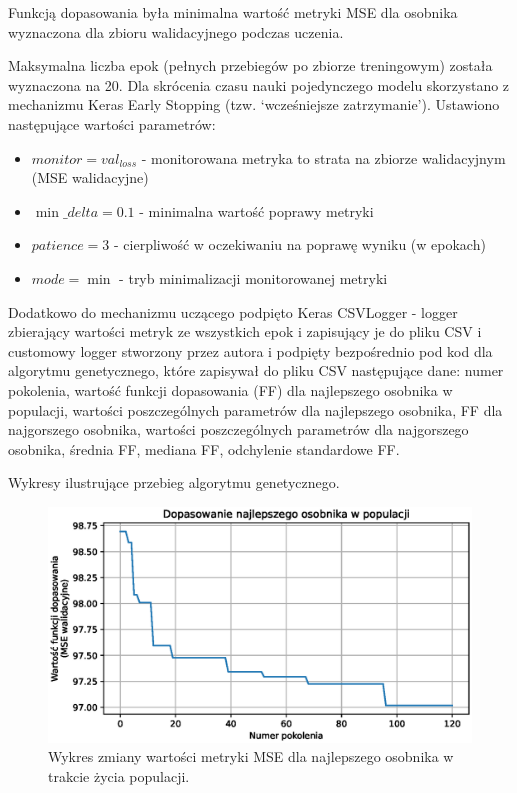 \documentclass[a4paper,12pt]{article}
\numberwithin{figure}{section}
\begin{document}
    \bigskip

    Funkcją dopasowania była minimalna wartość metryki MSE dla osobnika wyznaczona dla zbioru walidacyjnego podczas uczenia.

    \bigskip

    Maksymalna liczba epok (pełnych przebiegów po zbiorze treningowym) została wyznaczona na 20. Dla skrócenia czasu nauki pojedynczego modelu skorzystano z mechanizmu Keras Early Stopping (tzw. `wcześniejsze zatrzymanie'). Ustawiono następujące wartości parametrów:
    \begin{itemize}
        \item $monitor = val_{loss}$ - monitorowana metryka to strata na zbiorze walidacyjnym (MSE walidacyjne)
        \item $\min\_delta = 0.1$ - minimalna wartość poprawy metryki
        \item $patience = 3$ - cierpliwość w oczekiwaniu na poprawę wyniku (w epokach)
        \item $mode = \min$ - tryb minimalizacji monitorowanej metryki
    \end{itemize}

    \bigskip

    Dodatkowo do mechanizmu uczącego podpięto Keras CSVLogger - logger zbierający wartości metryk ze wszystkich epok i zapisujący je do pliku CSV i customowy logger stworzony przez autora i podpięty bezpośrednio pod kod dla algorytmu genetycznego, które zapisywał do pliku CSV następujące dane: numer pokolenia, wartość funkcji dopasowania (FF) dla najlepszego osobnika w populacji, wartości poszczególnych parametrów dla najlepszego osobnika, FF dla najgorszego osobnika, wartości poszczególnych parametrów dla najgorszego osobnika, średnia FF, mediana FF, odchylenie standardowe FF\@.

    \bigskip

    Wykresy ilustrujące przebieg algorytmu genetycznego.

    \bigskip

    \begin{figure}[H]
        \centering
        \includegraphics[width=\textwidth]{g_a_best_fitness}
        \caption{Wykres zmiany wartości metryki MSE dla najlepszego osobnika w trakcie życia populacji.}
        \label{fig:g_a_best_fitness}
    \end{figure}
\end{document}
